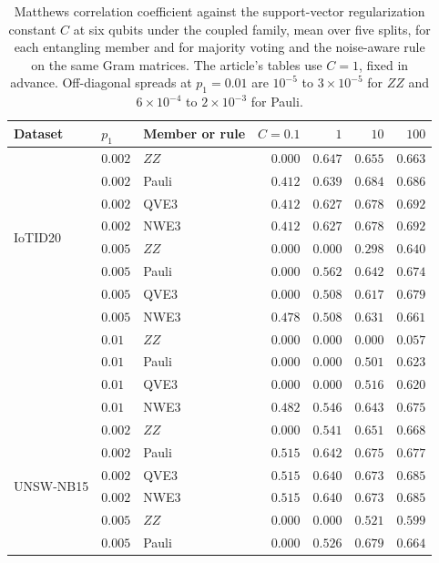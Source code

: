 \begin{table}[t]
\centering
\caption{Matthews correlation coefficient against the support-vector regularization constant
$C$ at six qubits under the coupled family, mean over five splits, for each entangling
member and for majority voting and the noise-aware rule on the same Gram matrices. The
article's tables use $C = 1$, fixed in advance. Off-diagonal spreads at $p_1 = 0.01$ are
$10^{-5}$ to $3\times10^{-5}$ for $ZZ$ and $6\times10^{-4}$ to $2\times10^{-3}$ for Pauli.}
\label{tab:csweep}
\begin{tabular}{@{}lllrrrr@{}}
\toprule
Dataset & $p_1$ & Member or rule & $C = 0.1$ & $1$ & $10$ & $100$ \\
\midrule
\multirow{8}{*}{IoTID20}
 & $0.002$ & $ZZ$ & $0.000$ & $0.647$ & $0.655$ & $0.663$ \\
 & $0.002$ & Pauli & $0.412$ & $0.639$ & $0.684$ & $0.686$ \\
 & $0.002$ & QVE3 & $0.412$ & $0.627$ & $0.678$ & $0.692$ \\
 & $0.002$ & NWE3 & $0.412$ & $0.627$ & $0.678$ & $0.692$ \\
 & $0.005$ & $ZZ$ & $0.000$ & $0.000$ & $0.298$ & $0.640$ \\
 & $0.005$ & Pauli & $0.000$ & $0.562$ & $0.642$ & $0.674$ \\
 & $0.005$ & QVE3 & $0.000$ & $0.508$ & $0.617$ & $0.679$ \\
 & $0.005$ & NWE3 & $0.478$ & $0.508$ & $0.631$ & $0.661$ \\
 & $0.01$ & $ZZ$ & $0.000$ & $0.000$ & $0.000$ & $0.057$ \\
 & $0.01$ & Pauli & $0.000$ & $0.000$ & $0.501$ & $0.623$ \\
 & $0.01$ & QVE3 & $0.000$ & $0.000$ & $0.516$ & $0.620$ \\
 & $0.01$ & NWE3 & $0.482$ & $0.546$ & $0.643$ & $0.675$ \\
\midrule
\multirow{8}{*}{UNSW-NB15}
 & $0.002$ & $ZZ$ & $0.000$ & $0.541$ & $0.651$ & $0.668$ \\
 & $0.002$ & Pauli & $0.515$ & $0.642$ & $0.675$ & $0.677$ \\
 & $0.002$ & QVE3 & $0.515$ & $0.640$ & $0.673$ & $0.685$ \\
 & $0.002$ & NWE3 & $0.515$ & $0.640$ & $0.673$ & $0.685$ \\
 & $0.005$ & $ZZ$ & $0.000$ & $0.000$ & $0.521$ & $0.599$ \\
 & $0.005$ & Pauli & $0.000$ & $0.526$ & $0.679$ & $0.664$ \\

\end{tabular}
\end{table}
